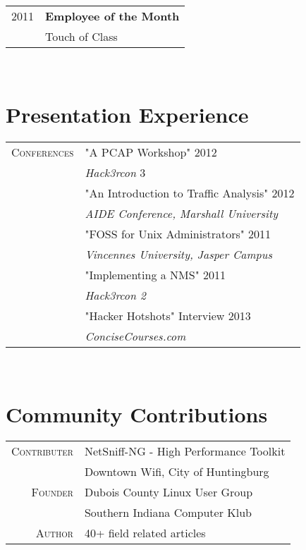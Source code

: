 \documentclass[10pt]{article} %
\begin{document}
{\begin{minipage}[t]{0.44\textwidth}
\begin{tabular}{rl}
2011	 & \textbf{Employee of the Month}\\
& Touch of Class
\end{tabular}\\[0pt]


\section{Presentation Experience} 

\begin{tabular}{rl}
\textsc{Conferences}
& "A PCAP Workshop" 2012 \\
& \textit{Hack3rcon} 3 \\
& "An Introduction to Traffic Analysis" 2012 \\
& \textit{AIDE Conference, Marshall University} \\
& "FOSS for Unix Administrators" 2011 \\
& \textit{Vincennes University, Jasper Campus} \\
& "Implementing a NMS" 2011 \\
& \textit{Hack3rcon 2} \\
& "Hacker Hotshots" Interview 2013 \\
& \textit{ConciseCourses.com} \\
\end{tabular} \\


\section{Community Contributions} 

\begin{tabular}{rl}
\textsc{Contributer}
& NetSniff-NG - High Performance Toolkit \\
& Downtown Wifi, City of Huntingburg\\
\textsc{Founder}
& Dubois County Linux User Group\\ 
& Southern Indiana Computer Klub \\
\textsc{Author}
& 40+  field related articles \\
\end{tabular}
	

\end{minipage}}
\end{document}
